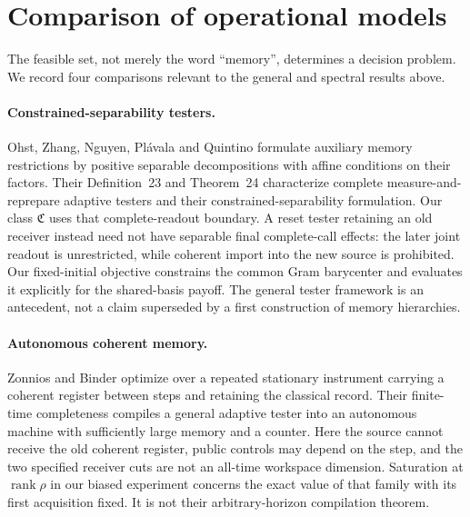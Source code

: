 \section{Comparison of operational models}
\label{sec:comparison96}\label{sec:comparison84}
The feasible set, not merely the word ``memory'', determines a decision
problem.  We record four comparisons relevant to the general and
spectral results above.

\paragraph{Constrained-separability testers.}
Ohst, Zhang, Nguyen, Pl\'avala and Quintino
\cite[Sections~5.3--5.4 and~6.1--6.2]{OZNPQ89} formulate auxiliary
memory restrictions by positive separable decompositions with affine
conditions on their factors.  Their Definition~23 and Theorem~24
characterize complete measure-and-reprepare adaptive testers and their
constrained-separability formulation.  Our class $\mathfrak C$ uses
that complete-readout boundary.  A reset tester retaining an old
receiver instead need not have separable final complete-call effects:
the later joint readout is unrestricted, while coherent import into
the new source is prohibited.  Our fixed-initial objective constrains
the common Gram barycenter and evaluates it explicitly for the
shared-basis payoff.  The general tester framework is an antecedent,
not a claim superseded by a first construction of memory hierarchies.

\paragraph{Autonomous coherent memory.}
Zonnios and Binder \cite[Proposition~2, Theorem~1 and Corollary~1]{ZB90}
optimize over a repeated stationary instrument carrying a coherent
register between steps and retaining the classical record.  Their
finite-time completeness compiles a general adaptive tester into an
autonomous machine with sufficiently large memory and a counter.
Here the source cannot receive the old coherent register, public
controls may depend on the step, and the two specified receiver cuts
are not an all-time workspace dimension.  Saturation at
$\operatorname{rank}\rho$ in our biased experiment concerns the
exact value of that family with its first acquisition fixed.  It is
not their arbitrary-horizon compilation theorem.

